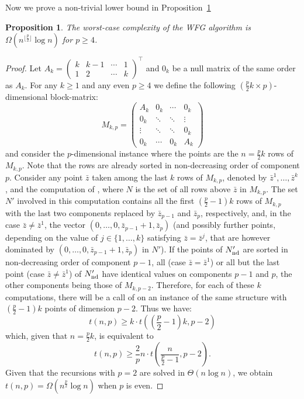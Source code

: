 \documentclass[a4paper,11pt]{article}
\newtheorem{proposition}[lemma]{Proposition}
\newcommand{\bz}{\bar{z}}
\newcommand{\Bzero}{0}
\begin{document}
Now we prove a non-trivial lower bound in Proposition~\ref{prop:wfg-complexity1}

\begin{proposition}\label{prop:wfg-complexity1}
  The worst-case complexity of the WFG algorithm is 
  $\Omega (n^{\lfloor \frac{p}{2}\rfloor} \log n)$
  for $p \geq 4$.
\end{proposition}

\begin{proof}
Let $A_k = \begin{pmatrix}
k & k-1 & \cdots & 1\\
1 & 2   & \cdots & k
\end{pmatrix}^{\intercal}$
and $\Bzero_k$ be a null matrix of the same order as $A_k$.
For any $k \geq 1$ and any even $p \geq 4$
we define the following $\left(\frac{p}{2}k \times p\right)$-dimensional
block-matrix:
\begin{equation}
M_{k,p} =
\begin{pmatrix}
  A_k      & \Bzero_k  & \cdots & \Bzero_k  \\
  \Bzero_k & \ddots    & \ddots & \vdots  \\
  \vdots   & \ddots    & \ddots & \Bzero_k  \\
  \Bzero_k & \cdots    & \Bzero_k  & A_k
\end{pmatrix}\label{eq:simple_wc}
\end{equation}
and consider the $p$-dimensional instance 
where the points are the $n=\frac{p}{2}k$ rows of $M_{k,p}$.
Note that the rows are already sorted in non-decreasing order of component $p$.
Consider any point $\bz$ taken among the last $k$ rows of $M_{k,p}$,
denoted by $\bz^1, \dots, \bz^k$,
and the computation of \WFG{$N\cup \{\bz\}$},
where $N$ is the set of all rows above $\bz$ in $M_{k,p}$.
The set $N'$ involved in this computation contains
all the first $(\frac{p}{2}-1)k$ rows of $M_{k,p}$
with the last two components replaced by $\bz_{p-1}$ and $\bz_{p}$, respectively,
and, in the case $\bz \neq \bz^1$, the vector $(0, \dots, 0, \bz_{p-1}+1, \bz_p)$
(and possibly further points, depending on the value of 
$j\in\{1,\dots,k\}$ satisfying $\bz=\bz^j$, that are however dominated by 
$(0, \dots, 0, \bz_{p-1}+1, \bz_p)$ in $N'$).
If the points of $N'_{\rm nd}$ are sorted in non-decreasing order of component $p-1$,
all (case $\bz = \bz^1$) or all but the last point (case $\bz \neq \bz^1$) of $N'_{\rm nd}$ 
have identical values on components $p-1$ and $p$,
the other components being those of $M_{k,p-2}$.
Therefore, for each of these $k$ computations,
there will be a call of {\WFG} on an instance of the same structure 
with $(\frac{p}{2}-1)k$ points of dimension $p-2$.
Thus we have:
$$ t(n, p) \geq k \cdot t\left(\left(\frac{p}{2}-1\right)k, p-2\right)$$
which, given that $n = \frac{p}{2}k$, is equivalent to
$$ t(n, p) \geq \frac{2}{p}n \cdot t\left(\frac{n}{\frac{p}{2}-1}, p-2\right).$$
Given that the recursions with $p=2$ are solved in $\Theta (n \log n)$,
we obtain $t (n, p) = \Omega (n^{\frac{p}{2}} \log n)$ when $p$ is even.


\end{proof}
\end{document}
